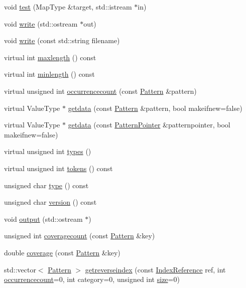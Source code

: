 \begin{DoxyCompactItemize}
\item 
void \hyperlink{classPatternModel_a21fb390761ae0fc47e3a48621c94698b}{test} (Map\+Type \&target, std\+::istream $\ast$in)
\item 
void \hyperlink{classPatternModel_a3456e788caacd51fe3c7fb8fdf547723}{write} (std\+::ostream $\ast$out)
\item 
void \hyperlink{classPatternModel_a73654320cd52e691fd7df037cf3ff013}{write} (const std\+::string filename)
\item 
virtual int \hyperlink{classPatternModel_ac0d63c6c6ada696e3a247e25df8487ec}{maxlength} () const 
\item 
virtual int \hyperlink{classPatternModel_a4777ec9b1e76ef3c2ccbc981dad15129}{minlength} () const 
\item 
virtual unsigned int \hyperlink{classPatternModel_a8f5bc659abbbdd456937e85642a97d40}{occurrencecount} (const \hyperlink{classPattern}{Pattern} \&pattern)
\item 
virtual Value\+Type $\ast$ \hyperlink{classPatternModel_aaec0fa3d026d88bc5b8e2dc5f0994015}{getdata} (const \hyperlink{classPattern}{Pattern} \&pattern, bool makeifnew=false)
\item 
virtual Value\+Type $\ast$ \hyperlink{classPatternModel_a1baf331b3a10a45fdadd6a835a744cf3}{getdata} (const \hyperlink{classPatternPointer}{Pattern\+Pointer} \&patternpointer, bool makeifnew=false)
\item 
virtual unsigned int \hyperlink{classPatternModel_af5df3d30417804589c552320add3285a}{types} ()
\item 
virtual unsigned int \hyperlink{classPatternModel_afac99feddfa4cf1dc44090c5148e518a}{tokens} () const 
\item 
unsigned char \hyperlink{classPatternModel_a7df468e440b875af0d9321d090f87dab}{type} () const 
\item 
unsigned char \hyperlink{classPatternModel_af56c31e031bb51d47e98cc433a46556e}{version} () const 
\item 
void \hyperlink{classPatternModel_aafa8d87b4b2269e796d97902f3214d22}{output} (std\+::ostream $\ast$)
\item 
unsigned int \hyperlink{classPatternModel_a5bad2b94ec96880f3e4307d55c42e492}{coveragecount} (const \hyperlink{classPattern}{Pattern} \&key)
\item 
double \hyperlink{classPatternModel_a07eb601afe937b144e100cd96d091d3a}{coverage} (const \hyperlink{classPattern}{Pattern} \&key)
\item 
std\+::vector$<$ \hyperlink{classPattern}{Pattern} $>$ \hyperlink{classPatternModel_a6b37ea19d0646bff54cae15290fc884c}{getreverseindex} (const \hyperlink{classIndexReference}{Index\+Reference} ref, int \hyperlink{classPatternModel_a8f5bc659abbbdd456937e85642a97d40}{occurrencecount}=0, int category=0, unsigned int \hyperlink{classPatternModel_a25f387acaf981af9962195bd05b3e7e2}{size}=0)

\end{DoxyCompactItemize}
